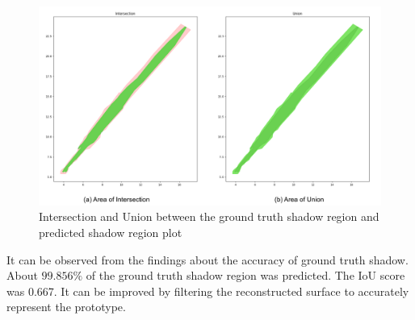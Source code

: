\begin{figure}[htbp]
    \centering
    \includegraphics[width=1\linewidth]{97_graphics//evaluation/shadow_iou.pdf}
    \caption{Intersection and Union between the ground truth shadow region and predicted shadow region plot}
    \label{fig:evaluation-shadow_iou}
\end{figure}

It can be observed from the findings about the accuracy of ground truth shadow. About \(99.856 \%\) of the ground truth shadow region was predicted. The IoU score was 0.667. It can be improved by filtering the reconstructed surface to accurately represent the prototype.


